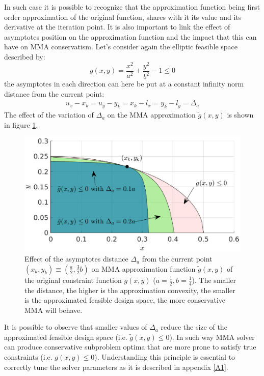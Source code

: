 In such case it is possible to recognize that the approximation function being first order approximation of the original function, shares with it its value and its derivative at the iteration point. It is also important to link the effect of asymptotes position on the approximation function and the impact that this can have on MMA conservatism. Let's consider again the elliptic feasible space described by:
\begin{equation}
g(x,y)=\frac{x^2}{a^2}+\frac{y^2}{b^2}-1\leq 0
\end{equation}
the asymptotes in each direction can here be put at a constant infinity norm distance from the current point:
\begin{eqnarray}
u_x-x_k=u_y-y_k=x_k-l_x=y_k-l_y=\Delta_a
\end{eqnarray}
The effect of the variation of $\Delta_a$ on the MMA approximation $\tilde{g}(x,y)$ is shown in figure \ref{fig.2.5b}.  
\begin{figure}[ht]
\centering
\includegraphics[width=12cm]{images/Ch2/MMA_conservatism}
\caption{Effect of the asymptotes distance $\Delta_a$ from the current point $(x_k,y_k)\equiv\left(\frac{a}{2},\frac{3}{2}b\right)$ on MMA approximation function $\tilde{g}(x,y)$ of the original constraint function $g(x,y)$  ($a=\frac{1}{2},b=\frac{1}{4}$). The smaller the distance, the higher is the approximation convexity, the smaller is the approximated feasible design space, the more conservative MMA will behave.}
\label{fig.2.5b}
\end{figure}
It is possible to observe that smaller values of $\Delta_a$ reduce the size of the approximated feasible design space (i.e. $\tilde{g}(x,y)\leq 0$). In such way MMA solver can produce conservative subproblem optima that are more prone to satisfy true constraints (i.e. $g(x,y)\leq 0$). Understanding this principle is essential to correctly tune the solver parameters as it is described in appendix \ref{A1}.
